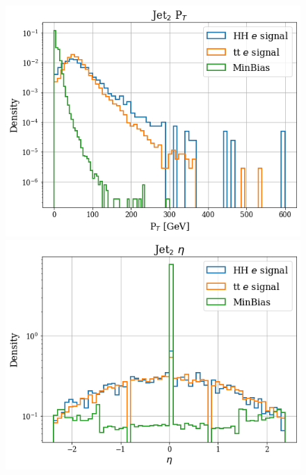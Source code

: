 \documentclass[../main.tex]{subfiles}
\begin{document}
 \begin{figure}[!ht]
  \begin{minipage}[b]{0.33\linewidth}
    \centering
    \includegraphics[width=1\linewidth]{Chapters/Plots/Hist_1ele_jet2_Et.png}
  \end{minipage}%
  \begin{minipage}[b]{0.33\linewidth}
    \centering
    \includegraphics[width=1\linewidth]{Chapters/Plots/Hist_1ele_jet2_Eta.png}
  \end{minipage} %
  \begin{minipage}[b]{0.33\linewidth}

\end{minipage}
\end{figure}
\end{document}
